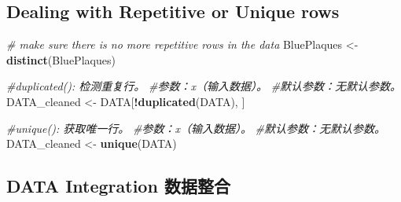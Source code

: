 \documentclass[
]{article}
\newenvironment{Shaded}{\begin{snugshade}}{\end{snugshade}}
\newcommand{\CommentTok}[1]{\textcolor[rgb]{0.56,0.35,0.01}{\textit{#1}}}
\newcommand{\FunctionTok}[1]{\textcolor[rgb]{0.13,0.29,0.53}{\textbf{#1}}}
\newcommand{\NormalTok}[1]{#1}
\newcommand{\OtherTok}[1]{\textcolor[rgb]{0.56,0.35,0.01}{#1}}
\newcommand{\SpecialCharTok}[1]{\textcolor[rgb]{0.81,0.36,0.00}{\textbf{#1}}}
\begin{document}
\begin{Shaded}
\end{Shaded}

\hypertarget{dealing-with-repetitive-or-unique-rows}{%
\subsection{Dealing with Repetitive or Unique
rows}\label{dealing-with-repetitive-or-unique-rows}}

\begin{Shaded}
\begin{Highlighting}[]
\CommentTok{\# make sure there is no more repetitive rows in the data}
\NormalTok{BluePlaques }\OtherTok{\textless{}{-}} \FunctionTok{distinct}\NormalTok{(BluePlaques)}

\CommentTok{\#duplicated(): 检测重复行。}
\CommentTok{\#参数：x（输入数据）。}
\CommentTok{\#默认参数：无默认参数。}
\NormalTok{DATA\_cleaned }\OtherTok{\textless{}{-}}\NormalTok{ DATA[}\SpecialCharTok{!}\FunctionTok{duplicated}\NormalTok{(DATA), ]}

\CommentTok{\#unique(): 获取唯一行。}
\CommentTok{\#参数：x（输入数据）。}
\CommentTok{\#默认参数：无默认参数。}
\NormalTok{DATA\_cleaned }\OtherTok{\textless{}{-}} \FunctionTok{unique}\NormalTok{(DATA)}
\end{Highlighting}
\end{Shaded}

\hypertarget{data-integration-ux6570ux636eux6574ux5408}{%
\subsection{DATA Integration
数据整合}\label{data-integration-ux6570ux636eux6574ux5408}}
\end{document}
